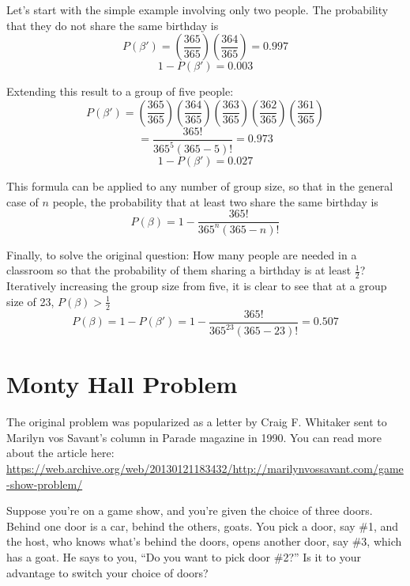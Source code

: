 \documentclass[
]{book}
\begin{document}
Let's start with the simple example involving only two people. The probability that they do not share the same birthday is
\[P(\beta') = \left( \frac{365}{365} \right) \left( \frac{364}{365} \right) = 0.997\]
\[1 - P(\beta') = 0.003\]

Extending this result to a group of five people:
\[P(\beta') = \left( \frac{365}{365} \right) \left( \frac{364}{365} \right) \left( \frac{363}{365} \right) 
\left( \frac{362}{365} \right) \left( \frac{361}{365} \right)\]
\[ = \frac{365!}{365^5(365 - 5)!} = 0.973\]
\[1 - P(\beta') = 0.027\]

This formula can be applied to any number of group size, so that in the general case of \(n\) people,
the probability that at least two share the same birthday is
\[P(\beta) = 1 - \frac{365!}{365^n(365 - n)!}\]

Finally, to solve the original question:
How many people are needed in a classroom so that the probability of them sharing a birthday is at least \(\frac{1}{2}\)?
Iteratively increasing the group size from five, it is clear to see that at a group size of 23, \(P(\beta) > \frac{1}{2}\)
\[P(\beta) = 1 - P(\beta') = 1 - \frac{365!}{365^{23}(365 - 23)!} = 0.507\]

\hypertarget{monty-hall-problem}{%
\section{Monty Hall Problem}\label{monty-hall-problem}}

The original problem was popularized as a letter by Craig F. Whitaker sent to Marilyn vos Savant's column in Parade magazine in 1990.
You can read more about the article here: \url{https://web.archive.org/web/20130121183432/http://marilynvossavant.com/game-show-problem/}

Suppose you're on a game show, and you're given the choice of three doors. Behind one door is a car, behind the others, goats.
You pick a door, say \#1, and the host, who knows what's behind the doors, opens another door, say \#3, which has a goat.
He says to you, ``Do you want to pick door \#2?'' Is it to your advantage to switch your choice of doors?

  
\end{document}
